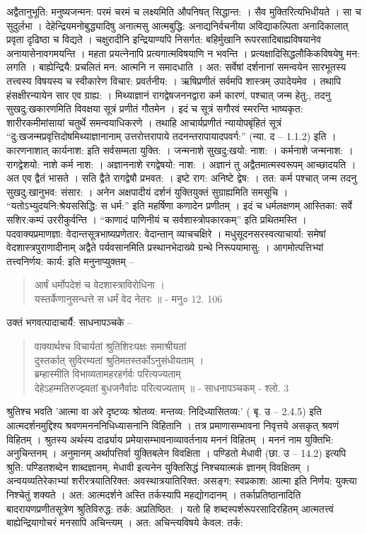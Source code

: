 {अद्वैतानुभूति: मनुष्यजन्मन: परमं चरमं च लक्ष्यमिति औपनिषत् सिद्धान्त: । सैव मुक्तिरित्यभिधीयते । सा च सुदुर्लभा । देहेन्द्रियमनोबुद्ध्यादिषु अनात्मसु आत्मबुद्धि: अनाद्यनिर्वचनीया अविद्याकल्पिता अनादिकालात् प्रवृता दृढिष्ठा च विद्यते । चक्षुरादीनि इन्द्रियाण्यपि निसर्गत: बहिर्मुखानि रूपरसादिबाह्यविषयानेव अनायासेनावगमयन्ति । महता प्रयत्नेनापि प्रत्यगात्मविषयाणि न भवन्ति । प्रत्यक्षादिसिद्धलौकिकविषयेषु मन: लगति । बाह्येन्द्रियै: प्रचलितं मन: आत्मनि न समादधाति । अत: सर्वेषां दर्शनानां समन्वयेन सारभूतस्य तत्त्वस्य विषयस्य च स्वीकारेण विचार: प्रवर्तनीय: । ऋषिप्रणीतं सर्वमपि शास्त्रम् उपादेयमेव । तथापि हंसक्षीरन्यायेन सार एव ग्राह्य: । मिथ्याज्ञानं रागद्वेषजननद्वारा कर्म कारणं, पश्चात् जन्म हेतु:, तदनु सुखदु:खकारणमिति विवक्षया सूत्रं प्रणीतं गौतमेन । इदं च सूत्रं सगौरवं स्मरन्ति भाष्यकृत: शारीरकमीमांसायां चतुर्थे समन्वयाधिकरणे । तथाहि आचार्यप्रणीतं न्यायोपबृंहितं सूत्रं “दु:खजन्मप्रवृत्तिदोषमिथ्याज्ञानानाम् उत्तरोत्तरापाये तदनन्तरापायादपवर्ग:” (न्या. द – 1.1.2) इति । कारणनाशात् कार्यनाश: इति सर्वसम्मता युक्ति: । जन्मनाशे सुखदु:खयो: नाश: । कर्मनाशे जन्मनाश: । रागद्वेशयो: नाशे कर्म नाश: । अज्ञाननाशे रगद्वेषयो: नाश: । अज्ञानं तु अद्वैतमात्मस्वरूपम् आच्छादयति । अत एव द्वैतं भासते । सति द्वैते रागद्वेषौ प्रभवत: । इष्टे राग: अनिष्टे द्वेष: । तत: कर्म पश्चात् जन्म तदनु सुखदु:खानुभव: संसार: । अनेन अक्षपादीयं दर्शनं युक्तियुक्तं सुग्राह्यमिति समसूचि । “यतोऽभ्युदयनि:श्रेयससिद्धि: स धर्म:” इति महर्षिणा कणादेन प्रणीतम् । इदं च धर्मलक्षणम् आस्तिका: सर्वे सशिर:कम्पं उररीकुर्वन्ति । “काणादं पाणिनीयं च सर्वशास्त्रोपकारकम्” इति प्रथितमस्ति । पदवाक्यप्रमाणज्ञा: वेदान्तसूत्रभाष्यप्रणेतार: वेदान्तान् व्याचचक्षिरे । मधुसूदनसरस्वत्याचार्या: समेषां वेदशास्त्रपुराणादीनाम् अद्वैते पर्यवसानमिति प्रस्थानभेदाख्ये ग्रन्थे निरूपयामासु: । आगमोत्पत्तिभ्यां तत्त्वनिर्णय: कार्य: इति मनुनाप्युक्तम् –
\begin{verse}
आर्षं धर्मोपदेशं च वेदशास्त्राविरोधिना ।\\
यस्तर्केणानुसन्धत्ते स धर्मं वेद नेतरः ॥ - मनु० 12. 106
\end{verse}
उक्तं भगवत्पादाचार्यै: साधनापञ्चके –
\begin{verse}
वाक्यार्थश्च विचार्यतां श्रुतिशिरःपक्षः समाश्रीयतां\\
दुस्तर्कात् सुविरम्यतां श्रुतिमतस्तर्कोऽनुसंधीयताम् ।\\  
ब्रम्हास्मीति विभाव्यतामहरहर्गर्वः परित्यज्यताम्\\  
देहेऽहम्मतिरुज्झ्यतां बुधजनैर्वादः परित्यज्यताम् ॥ - साधनापञ्चकम् - श्लो. 3
\end{verse}
श्रुतिश्च भवति 'आत्मा वा अरे दृष्टव्यः श्रोतव्य: मन्तव्य: निदिध्यासितव्य:' ( बृ. उ – 2.4.5) इति आत्मदर्शनमुद्दिश्य श्रवणमनननिधिध्यासनानि विहितानि । तत्र प्रमाणासम्भावना निवृत्तये असकृत् श्रवणं विहितम् । श्रुतस्य अर्थस्य दार्ढ्याय प्रमेयासम्भावनाव्यावर्तनाय मननं विहितम् । मननं नाम युक्तिभि: अनुचिन्तनम् । अनुमानम् अर्थापत्तिर्वा युक्तिबलेन विवक्षिता । पण्डितो मेधावी (छा. उ – 14.2) इत्यपि श्रुति: पण्डितशब्देन शाब्दज्ञानम्, मेधावी इत्यनेन युक्तिसिद्धं निश्चयात्मकं ज्ञानम् विवक्षितम् । अन्वयव्यतिरेकाभ्यां शरीरत्रयातिरिक्त: अवस्थात्रयातिरिक्त: असङ्ग: स्वप्रकाश: आत्मा इति निर्णय: युक्त्या निश्चेतुं शक्यते । अत: आत्मदर्शने अस्ति तर्कस्यापि महद्योगदानम् । तर्काप्रतिष्ठानादिति बादरायणप्रणीतसूत्रेण श्रुतिविरुद्ध: तर्क: अप्रतिष्ठित: । यतो हि शब्दस्पर्शरूपरसादिरहितम् आत्मतत्त्वं बाह्येन्द्रियागोचरं मनसापि अचिन्त्यम् । अत: अचिन्त्यविषये केवल: तर्क:
}

